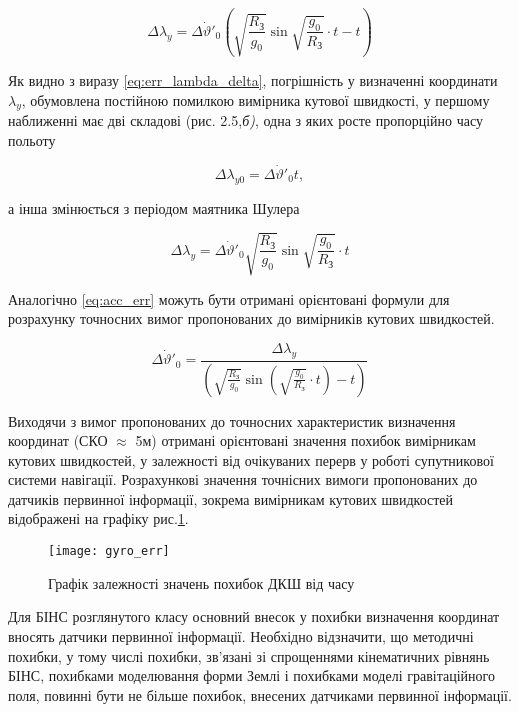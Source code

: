 \begin{equation} 
\label{eq:err_lambda_delta} 
\Delta \lambda _{y} =\Delta \dot{\vartheta }'_{0} \left(\sqrt{\frac{R_{\text{З}} }{g_{0} } } \sin \sqrt{\frac{g_{0} }{R_{\text{З}} } } \cdot t-t\right)
\end{equation} 


Як видно з виразу \eqref{eq:err_lambda_delta},  погрішність у визначенні координати  $\lambda _{y} $, обумовлена 
постійною  помилкою  вимірника кутової швидкості, у першому наближенні має дві складові (рис. 2.5,\textit{б)}, 
одна  з яких  росте пропорційно  часу польоту

\[\Delta \lambda _{y0} =\Delta \dot{\vartheta }'_{0} t,\] 

а інша  змінюється з періодом маятника Шулера

\[\Delta \lambda _{y} =\Delta \dot{\vartheta }'_{0} \sqrt{\frac{R_{\text{З}} }{g_{0} } } \sin \sqrt{\frac{g_{0} }{R_{\text{З}} } } \cdot t\] 


Аналогічно \eqref{eq:acc_err} можуть бути отримані орієнтовані формули для розрахунку точносних вимог 
пропонованих до вимірників кутових швидкостей.

\[\Delta \dot{\vartheta }'_{0} =\frac{\Delta \lambda _{y} }{\left(\sqrt{\frac{R_{{\text{З}}} }{g_{0} } } \sin \left(\sqrt{\frac{g_{0} }{R_{{\text{З}}} } } \cdot t\right)-t\right)} \] 

Виходячи з вимог пропонованих до точносних характеристик визначення координат (СКО $\approx$ 5м) 
отримані орієнтовані значення похибок вимірникам кутових швидкостей, у залежності від очікуваних 
перерв у роботі супутникової системи навігації. Розрахункові значення точнісних вимоги пропонованих 
до датчиків первинної інформації, зокрема вимірникам кутових швидкостей відображені на графіку рис.\ref{fig:gyro_err}.

\begin{figure}[here]
\centering
\texttt{[image: gyro\_err]}
\caption{Графік залежності значень похибок ДКШ від часу}
\label{fig:gyro_err}
\end{figure} 
Для БІНС розглянутого класу основний внесок у похибки визначення координат вносять датчики первинної 
інформації. Необхідно відзначити, що методичні похибки, у тому числі похибки, зв'язані зі спрощеннями 
кінематичних рівнянь БІНС, похибками моделювання форми Землі і похибками моделі гравітаційного поля, 
повинні бути не більше  похибок, внесених датчиками первинної інформації.

